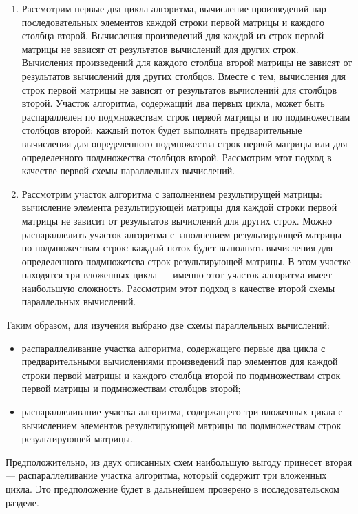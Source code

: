 \documentclass[12pt]{report}
\begin{document}
\begin{enumerate}
	\item 
	Рассмотрим первые два цикла алгоритма, вычисление произведений пар последовательных элементов каждой строки первой матрицы и каждого столбца второй. Вычисления произведений для каждой из строк первой матрицы не зависят от результатов вычислений для других строк. Вычисления произведений для каждого столбца второй матрицы не зависят от результатов вычислений для других столбцов. Вместе с тем, вычисления для строк первой матрицы не зависят от результатов вычислений для столбцов второй. Участок алгоритма, содержащий два первых цикла, может быть распараллелен по подмножествам строк первой матрицы и по подмножествам столбцов второй: каждый поток будет выполнять предварительные вычисления для определенного подмножества строк первой матрицы или для определенного подмножества столбцов второй. Рассмотрим этот подход в качестве первой схемы параллельных вычислений.
	
	\item 
	
	Рассмотрим участок алгоритма с заполнением результирущей матрицы: вычисление элемента результирующей матрицы для каждой строки первой матрицы не зависит от результатов вычислений для других строк. Можно распараллелить участок алгоритма с заполнением результирующей матрицы по подмножествам строк: каждый поток будет выполнять вычисления для определенного подмножетсва строк результирующей матрицы. В этом участке находятся три вложенных цикла --- именно этот участок алгоритма имеет наибольшую сложность. Рассмотрим этот подход в качестве второй схемы параллельных вычислений. 
\end{enumerate}

Таким образом, для изучения выбрано две схемы параллельных вычислений:
\begin{itemize}
	\item распараллеливание участка алгоритма, содержащего первые два цикла с предварительными вычислениями произведений пар элементов для каждой строки первой матрицы и каждого столбца второй по подмножествам строк первой матрицы и подмножествам столбцов второй;
	\item распараллеливание участка алгоритма, содержащего три вложенных цикла с вычислением элементов результирующей матрицы по подмножествам строк результирующей матрицы.
\end{itemize}

Предположительно, из двух описанных схем наибольшую выгоду принесет вторая --- распараллеливание участка алгоритма, который содержит три вложенных цикла. Это предположение будет в дальнейшем проверено в исследовательском разделе.
\end{document}
